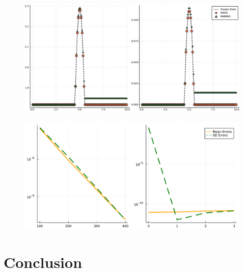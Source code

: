 \documentclass[12pt]{article}
\begin{document}
\begin{figure}[!htb]
    \centering
    \includegraphics[width=\textwidth]{Figures/u4}
    \caption{}
    \label{fig:u4}
\end{figure}

\begin{figure}[!htb]
    \centering
    \includegraphics[width=\textwidth]{Figures/convergence}
    \caption{}
    \label{fig:convergence}
\end{figure}



\section{Conclusion}

\clearpage
\printbibliography
\end{document}
